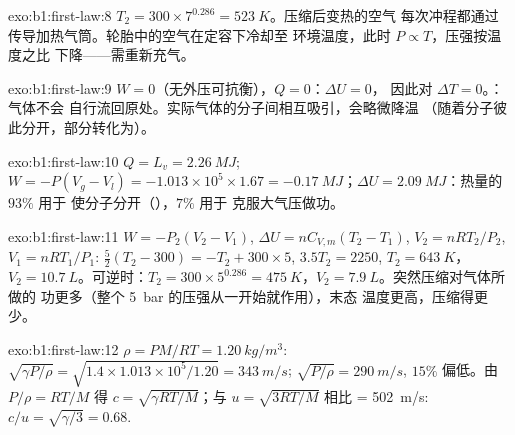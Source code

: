 \begin{solution}{exo:b1:first-law:8}
$T_2 = 300 \times 7^{0.286} = \qty{523}{K}$。压缩后变热的空气
每次冲程都通过传导加热气筒。轮胎中的空气在定容下冷却至
环境温度，此时 $P \propto T$，压强按温度之比
下降——需重新充气。
\end{solution}

\begin{solution}{exo:b1:first-law:9}
$W = 0$（无外压可抗衡），$Q = 0$：$\Delta U = 0$，
因此对 $\Delta T = 0$。：气体不会
自行流回原处。实际气体的分子间相互吸引，会略微降温
（随着分子彼此分开，部分转化为）。
\end{solution}

\begin{solution}{exo:b1:first-law:10}
$Q = L_v = \qty{2.26}{MJ}$; $W = -P(V_g - V_l) = -1.013\times10^5 \times 1.67 =
\qty{-0.17}{MJ}$；$\Delta U = \qty{2.09}{MJ}$：热量的 $93\%$ 用于
使分子分开（），$7\%$ 用于
克服大气压做功。
\end{solution}

\begin{solution}{exo:b1:first-law:11}
$W = -P_2(V_2 - V_1)$, $\Delta U = nC_{V,m}(T_2 - T_1)$, $V_2 = nRT_2/P_2$, $V_1
= nRT_1/P_1$: $\tfrac52(T_2 - 300) = -T_2 + 300 \times 5$, $3.5T_2 = 2250$,
$T_2 = \qty{643}{K}$，$V_2 = \qty{10.7}{L}$。可逆时：$T_2 = 300 \times
5^{0.286} = \qty{475}{K}$，$V_2 = \qty{7.9}{L}$。突然压缩对气体所做的
功更多（整个 \qty{5}{bar} 的压强从一开始就作用），末态
温度更高，压缩得更少。
\end{solution}

\begin{solution}{exo:b1:first-law:12}
$\rho = PM/RT = \qty{1.20}{kg/m^3}$: $\sqrt{\gamma P/\rho} = \sqrt{1.4 \times
1.013\times10^5/1.20} = \qty{343}{m/s}$; $\sqrt{P/\rho} = \qty{290}{m/s}$, $15\%$
偏低。由 $P/\rho = RT/M$ 得 $c = \sqrt{\gamma RT/M}$；与 $u = \sqrt{3RT/M}$ 相比
= \qty{502}{m/s}: $c/u = \sqrt{\gamma/3} = 0.68$.
\end{solution}

